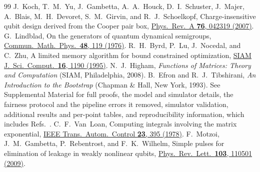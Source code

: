 \documentclass[aps,pra,twocolumn,superscriptaddress,reprint,nofootinbib,floatfix]{revtex4-2}
\theoremstyle{definition}
\begin{document}
\begin{thebibliography}{99}
 J.~Koch, T.~M.~Yu, J.~Gambetta, A.~A.~Houck, D.~I.~Schuster, J.~Majer, A.~Blais, M.~H.~Devoret, S.~M.~Girvin, and R.~J.~Schoelkopf, Charge-insensitive qubit design derived from the Cooper pair box, \href{https://doi.org/10.1103/PhysRevA.76.042319}{Phys.\ Rev.\ A \textbf{76}, 042319 (2007)}.
 G.~Lindblad, On the generators of quantum dynamical semigroups, \href{https://doi.org/10.1007/BF01608499}{Commun.\ Math.\ Phys.\ \textbf{48}, 119 (1976)}.
 R.~H.~Byrd, P.~Lu, J.~Nocedal, and C.~Zhu, A limited memory algorithm for bound constrained optimization, \href{https://doi.org/10.1137/0916069}{SIAM J.\ Sci.\ Comput.\ \textbf{16}, 1190 (1995)}.
 N.~J.~Higham, \emph{Functions of Matrices: Theory and Computation} (SIAM, Philadelphia, 2008).
 B.~Efron and R.~J.~Tibshirani, \emph{An Introduction to the Bootstrap} (Chapman \& Hall, New York, 1993).
 See Supplemental Material for full proofs, the model and simulator details, the fairness protocol and the pipeline errors it removed, simulator validation, additional results and per-point tables, and reproducibility information, which includes Refs.~\cite{VanLoan1978,Motzoi2009}.
 C.~F.~Van~Loan, Computing integrals involving the matrix exponential, \href{https://doi.org/10.1109/TAC.1978.1101743}{IEEE Trans.\ Autom.\ Control \textbf{23}, 395 (1978)}.
 F.~Motzoi, J.~M.~Gambetta, P.~Rebentrost, and F.~K.~Wilhelm, Simple pulses for elimination of leakage in weakly nonlinear qubits, \href{https://doi.org/10.1103/PhysRevLett.103.110501}{Phys.\ Rev.\ Lett.\ \textbf{103}, 110501 (2009)}.
\end{thebibliography}
\end{document}

